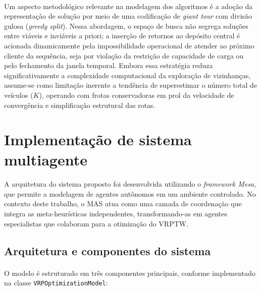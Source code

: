 \paragraph{} Um aspecto metodológico relevante na modelagem dos algoritmos é a adoção da representação de solução por meio de uma codificação de \textit{giant tour} com divisão gulosa (\textit{greedy split}). Nessa abordagem, o espaço de busca não segrega soluções entre viáveis e inviáveis a priori; a inserção de retornos ao depósito central é acionada dinamicamente pela impossibilidade operacional de atender ao próximo cliente da sequência, seja por violação da restrição de capacidade de carga ou pelo fechamento da janela temporal. Embora essa estratégia reduza significativamente a complexidade computacional da exploração de vizinhanças, assume-se como limitação inerente a tendência de superestimar o número total de veículos ($K$), operando com frotas conservadoras em prol da velocidade de convergência e simplificação estrutural das rotas.

\section{Implementação de sistema multiagente}
\label{sec:inc_sma}

\paragraph{} A arquitetura do sistema proposto foi desenvolvida utilizando o \textit{framework Mesa}, que permite a modelagem de agentes autônomos em um ambiente controlado. No contexto deste trabalho, o MAS atua como uma camada de coordenação que integra as meta-heurísticas independentes, transformando-as em agentes especialistas que colaboram para a otimização do VRPTW.

\subsection{Arquitetura e componentes do sistema}

\paragraph{} O modelo é estruturado em três componentes principais, conforme implementado na classe \texttt{VRPOptimizationModel}:

